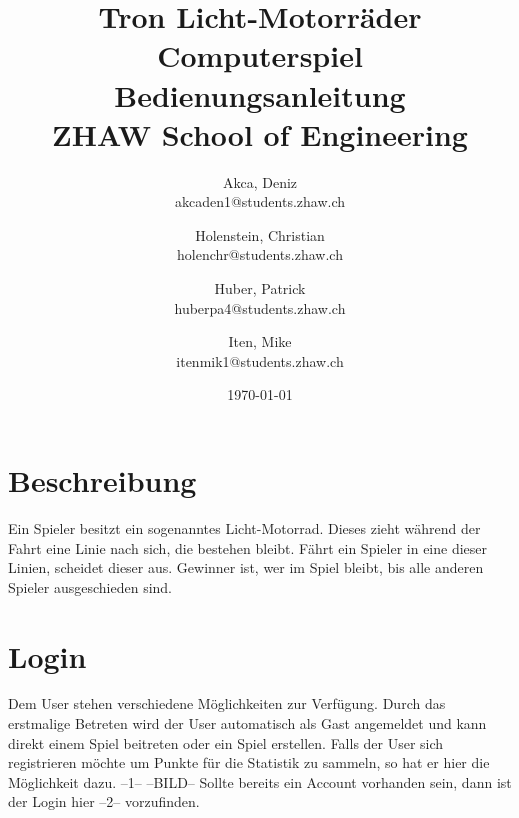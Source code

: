 \documentclass[11pt,ngerman]{article}
\begin{document}
    \title{Tron Licht-Motorräder Computerspiel\\
        \vspace{1cm}
        Bedienungsanleitung \\
        \vspace{0.5cm}
        \small{}ZHAW  School of Engineering
        \vspace{1.5cm}
    }
    \author{
        Akca, Deniz\\
        \small{akcaden1@students.zhaw.ch}
        \and
        Holenstein, Christian\\
        \small{holenchr@students.zhaw.ch}
        \and
        Huber, Patrick\\
        \small{huberpa4@students.zhaw.ch}
        \and
        Iten, Mike\\
        \small{itenmik1@students.zhaw.ch}
        \vspace{1.5cm}
    }
   \date{\today}

    \maketitle
    \newpage

    \tableofcontents

    \newpage
    
    \section{Beschreibung}
    
    Ein Spieler besitzt ein sogenanntes Licht-Motorrad. Dieses zieht während der Fahrt eine Linie nach sich, die bestehen bleibt. Fährt ein Spieler in eine dieser Linien, scheidet dieser aus. Gewinner ist, wer im Spiel bleibt, bis alle anderen Spieler ausgeschieden sind.
    
    \section{Login}
    
    Dem User stehen verschiedene Möglichkeiten zur Verfügung. Durch das erstmalige Betreten wird der User automatisch als Gast angemeldet und kann direkt einem Spiel beitreten oder ein Spiel erstellen. 
    Falls der User sich registrieren möchte um Punkte für die Statistik zu sammeln, so hat er hier die Möglichkeit dazu. --1--
    --BILD--
    Sollte bereits ein Account vorhanden sein, dann ist der Login hier --2-- vorzufinden.
    
\end{document}
